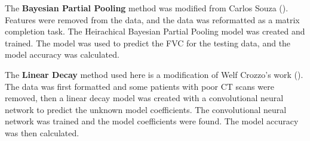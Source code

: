 \documentclass[12pt]{article}
\begin{document}

The \textbf{Bayesian Partial Pooling} method was modified from Carlos Souza (\cite{bayesian}). 
Features were removed from the data, and the data was reformatted as a matrix completion task.
The Heirachical Bayesian Partial Pooling model was created and trained.
The model was used to predict the FVC for the testing data, and the model accuracy was calculated.





The \textbf{Linear Decay} method used here is a modification of Welf Crozzo's work (\cite{lineardecay}).
The data was first formatted and some patients with poor CT scans were removed, then a linear decay model was created with a convolutional neural network to predict the unknown model coefficients.
The convolutional neural network was trained and the model coefficients were found.
The model accuracy was then calculated.
\end{document}
